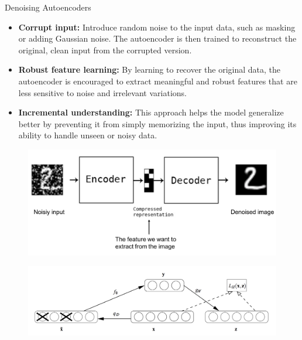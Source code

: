 \begin{frame}[allowframebreaks]{Denoising Autoencoders}
    \begin{itemize}
        \item \textbf{Corrupt input:} Introduce random noise to the input data, such as masking or adding Gaussian noise. The autoencoder is then trained to reconstruct the original, clean input from the corrupted version.
        \item \textbf{Robust feature learning:} By learning to recover the original data, the autoencoder is encouraged to extract meaningful and robust features that are less sensitive to noise and irrelevant variations.
        \item \textbf{Incremental understanding:} This approach helps the model generalize better by preventing it from simply memorizing the input, thus improving its ability to handle unseen or noisy data.
    \end{itemize}

    \framebreak

    \begin{figure}
        \centering
        \includegraphics[width=\linewidth,height=0.9\textheight,keepaspectratio]{images/ssl/slide_12_1_img.png}
    \end{figure}

    \framebreak

    \begin{figure}
        \centering
        \includegraphics[width=\linewidth,height=0.9\textheight,keepaspectratio]{images/ssl/slide_13_1_img.png}
    \end{figure}


\end{frame}
